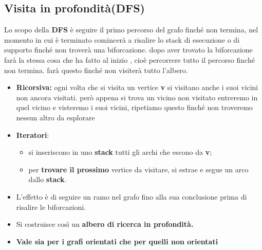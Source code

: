 \subsection{Visita in profondità(DFS)}
Lo scopo della \textbf{DFS} è seguire il primo percorso del grafo finché non termina, nel momento in cui è terminato comincerà a risalire lo stack di esecuzione o di supporto finché non troverà una biforcazione. dopo aver trovato la biforcazione farà la stessa cosa che ha fatto al inizio , cioè percorrere tutto il percorso finché non termina. farà questo finché non visiterà tutto l'albero.
\begin{itemize}
    \item \textbf{Ricorsiva:} ogni volta che si visita un vertice \textbf{v} si visitano
    anche i suoi vicini non ancora visitati. però appena si trova un vicino non visitato entreremo in quel vicino e visteremo i suoi vicini, ripetiamo questo finché non troveremo nessun altro da esplorare
    \item \textbf{Iteratori}:
        \begin{itemize}
            \item si inseriscono in uno \textbf{stack} tutti gli archi che escono da \textbf{v};
            \item per \textbf{trovare il prossimo} vertice da visitare, si estrae e segue
            un arco dallo \textbf{stack}.
        \end{itemize}
        

    \item L’effetto è di seguire un ramo nel grafo fino alla sua
    conclusione prima di risalire le biforcazioni.
    \item Si costruisce così un \textbf{albero di ricerca in profondità.}
    \item \textbf{Vale sia per i grafi orientati che per quelli non orientati}
\end{itemize}
\newpage
